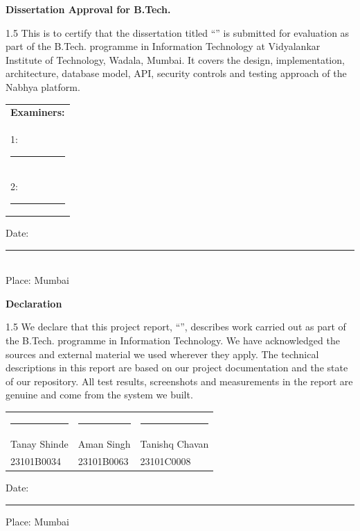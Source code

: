 \cleardoublepage
\thispagestyle{empty}
\begin{center}{\Huge\textbf{Dissertation Approval for B.Tech.}}\end{center}
\vspace{0.4in}
\begin{spacing}{1.5}
This is to certify that the dissertation titled ``\textbf{\projtitle}'' is submitted for evaluation as part of the B.Tech. programme in Information Technology at Vidyalankar Institute of Technology, Wadala, Mumbai. It covers the design, implementation, architecture, database model, API, security controls and testing approach of the Nabhya platform.
\end{spacing}
\vspace{0.55in}
\begin{flushright}
\begin{tabular}{l}
\textbf{Examiners:}\\[0.35in]
1: \rule{5cm}{0.4pt}\\[0.35in]
2: \rule{5cm}{0.4pt}
\end{tabular}
\end{flushright}
\vspace{0.4in}
\noindent Date: \rule{5cm}{0.4pt}\\[0.3in]
Place: Mumbai

\cleardoublepage
\thispagestyle{empty}
\begin{center}{\Huge\textbf{Declaration}}\end{center}
\vspace{0.4in}
\begin{spacing}{1.5}
We declare that this project report, ``\projtitle'', describes work carried out as part of the B.Tech. programme in Information Technology. We have acknowledged the sources and external material we used wherever they apply. The technical descriptions in this report are based on our project documentation and the state of our repository. All test results, screenshots and measurements in the report are genuine and come from the system we built.
\end{spacing}
\vspace{0.6in}
\begin{center}
\begin{tabularx}{0.95\textwidth}{@{}>{\centering\arraybackslash}X >{\centering\arraybackslash}X >{\centering\arraybackslash}X@{}}
\rule{3.4cm}{0.4pt} & \rule{3.4cm}{0.4pt} & \rule{3.4cm}{0.4pt} \\[0.1in]
Tanay Shinde & Aman Singh & Tanishq Chavan \\
23101B0034 & 23101B0063 & 23101C0008 \\
\end{tabularx}
\end{center}
\vspace{0.5in}
\noindent Date: \rule{4cm}{0.4pt} \hfill Place: Mumbai

